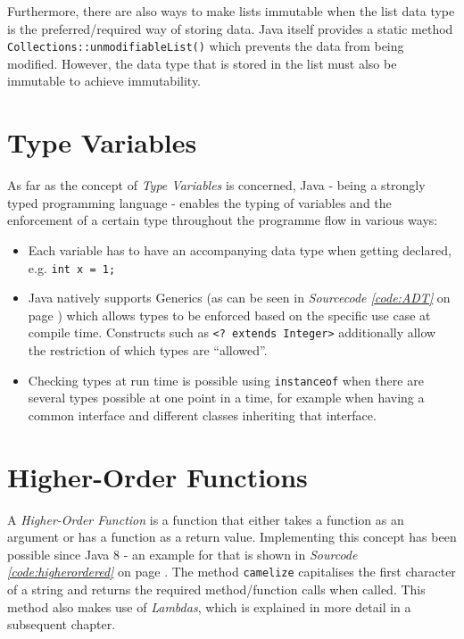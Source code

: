 \documentclass[a4paper,12pt,twoside]{scrreprt}
\begin{document}
\medskip

Furthermore, there are also ways to make lists immutable when the list data type is the preferred/required way of storing data. Java itself provides a static method \texttt{Collections::unmodifiableList()} which prevents the data from being modified. However, the data type that is stored in the list must also be immutable to achieve immutability.

\section{Type Variables}
As far as the concept of \textit{Type Variables} is concerned, Java - being a strongly typed programming language - enables the typing of variables and the enforcement of a certain type throughout the programme flow in various ways:

\begin{itemize}
    \item Each variable has to have an accompanying data type when getting declared, e.g. \texttt{int x = 1;}
    \item Java natively supports Generics (as can be seen in \textit{Sourcecode \ref{code:ADT}} on page \pageref{code:ADT}) which allows types to be enforced based on the specific use case at compile time. Constructs such as \texttt{<? extends Integer>} additionally allow the restriction of which types are \enquote{allowed}.
    \item Checking types at run time is possible using \texttt{instanceof} when there are several types possible at one point in a time, for example when having a common interface and different classes inheriting that interface.
\end{itemize}

\clearpage

\section{Higher-Order Functions}
A \textit{Higher-Order Function} is a function that either takes a function as an argument or has a function as a return value. Implementing this concept has been possible since Java 8 - an example for that is shown in \textit{Sourcode \ref{code:higherordered}} on page \pageref{code:higherordered}. The method \texttt{camelize} capitalises the first character of a string and returns the required method/function calls when called. This method also makes use of \textit{Lambdas}, which is explained in more detail in a subsequent chapter.
\end{document}
